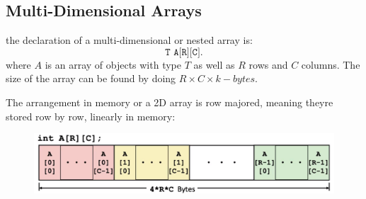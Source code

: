 \documentclass[12pt]{book}
\begin{document}
\subsection*{Multi-Dimensional Arrays}
the declaration of a multi-dimensional or nested array is:
\[
\texttt{T A[R][C]}
.\] 
where $A$ is an array of objects with type  $T$ as well as $R$ rows and  $C$ columns.
The size of the array can be found by doing $R\times C\times k-bytes$.
\pagebreak

The arrangement in memory or a 2D array is row majored, meaning theyre stored row by row, 
linearly in memory:
\begin{figure}[h]
        \centering
        \includegraphics[scale = 0.3]{./figures/arrayStruct}
\end{figure}
\end{document}
